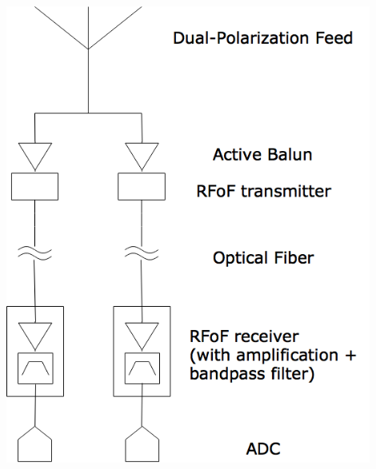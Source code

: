 \documentclass[]{spie}  %
\begin{document}
\begin{minipage}{0.35\textwidth}
  \centering
  \includegraphics[width=0.9\textwidth]{Hirax_cartoon.png} 
  \vspace{0.2in}
\end{minipage}
\end{document}
